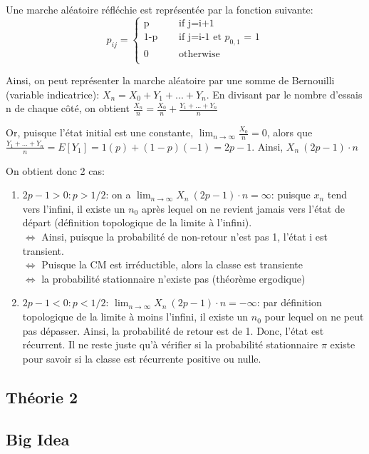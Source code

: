 \documentclass{article}
\begin{document}
Une marche aléatoire réfléchie est représentée par la fonction suivante:
\[
    p_{ij} = \begin{cases}
	\text{p} &\quad\text{ if j=i+1 }\\
	\text{1-p} &\quad\text{ if j=i-1 et $p_{0,1}$ = 1}\\
	\text{0} &\quad\text{ otherwise }\\
    \end{cases}
\]

Ainsi, on peut représenter la marche aléatoire par une somme de Bernouilli
(variable indicatrice): $ X_n = X_0 + Y_1 + ... + Y_n$. En divisant par
le nombre d'essais n de chaque côté, on obtient
$\frac{X_n}{n} = \frac{X_0}{n} + \frac{Y_1 + ...+Y_n}{n} $

Or, puisque l'état initial est une constante, $\lim_{n \to \infty} \frac{X_0}{n} =0$, alors que $ \frac{Y_1 + ...+Y_n}{n} = E[Y_1] = 1(p) + (1-p)(-1) = 2p-1 $. Ainsi, $X_n ~ (2p-1) \cdot n$

On obtient donc 2 cas:
\begin{enumerate}
    \item $2p-1>0: p>1/2$: on a $\lim_{n \to \infty} X_n ~ (2p-1) \cdot n = \infty $: puisque $x_n$ tend vers l'infini, il existe un $n_0$ après lequel
	on ne revient jamais vers l'état de départ (définition
	topologique de la limite à l'infini). \\ $\Longleftrightarrow$
	Ainsi, puisque la probabilité de non-retour n'est pas 1, l'état
	i est transient.\\ $\Longleftrightarrow$ Puisque la CM est
	irréductible, alors la classe est transiente\\
	$\Longleftrightarrow$ la probabilité stationnaire n'existe pas
	(théorème ergodique)
    \item $2p-1<0: p<1/2$: $\lim_{n \to \infty} X_n ~ (2p-1) \cdot n = -\infty $: par définition topologique de la limite à moins l'infini, il
	existe un $n_0$ pour lequel on ne peut pas dépasser. Ainsi,
	la probabilité de retour est de 1. Donc, l'état est récurrent.
	Il ne reste juste qu'à vérifier si la probabilité stationnaire
	$\pi$ existe pour savoir si la classe est récurrente positive ou
	nulle.
\end{enumerate}

\subsection{Théorie 2}
\subsection*{Big Idea}
\end{document}
